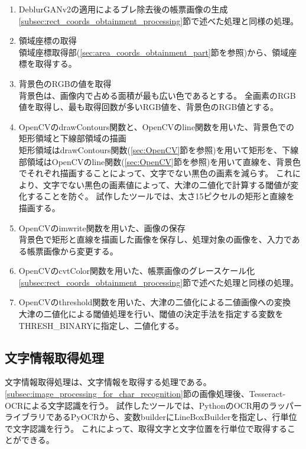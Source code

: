 \begin{enumerate}
    \item DeblurGANv2の適用によるブレ除去後の帳票画像の生成\\
        \ref{subsec:rect_coords_obtainment_processing}節で述べた処理と同様の処理。
    \item 領域座標の取得\\
        領域座標取得部(\ref{sec:area_coords_obtainment_part}節を参照)から、領域座標を取得する。
    \item 背景色のRGBの値を取得\\
        背景色は、画像内で占める面積が最も広い色であるとする。
        全画素のRGB値を取得し、最も取得回数が多いRGB値を、背景色のRGB値とする。
    \item OpenCVのdrawContours関数と、OpenCVのline関数を用いた、背景色での矩形領域と下線部領域の描画\\
        矩形領域はdrawContours関数(\ref{sec:OpenCV}節を参照)を用いて矩形を、下線部領域はOpenCVのline関数(\ref{sec:OpenCV}節を参照)を用いて直線を、背景色でそれぞれ描画することによって、文字でない黒色の画素を減らす。
        これにより、文字でない黒色の画素値によって、大津の二値化で計算する閾値が変化することを防ぐ。
        試作したツールでは、太さ15ピクセルの矩形と直線を描画する。
    \item OpenCVのimwrite関数を用いた、画像の保存\\
        背景色で矩形と直線を描画した画像を保存し、処理対象の画像を、入力である帳票画像から変更する。
    \item OpenCVのcvtColor関数を用いた、帳票画像のグレースケール化\\
        \ref{subsec:rect_coords_obtainment_processing}節で述べた処理と同様の処理。
    \item OpenCVのthreshold関数を用いた、大津の二値化による二値画像への変換\\
        大津の二値化による閾値処理を行い、閾値の決定手法を指定する変数をTHRESH\_BINARYに指定し、二値化する。
\end{enumerate}

\subsection{文字情報取得処理}\label{subsec:char_information_obtainment_processing}
文字情報取得処理は、文字情報を取得する処理である。
\ref{subsec:image_processing_for_char_recognition}節の画像処理後、Tesseract-OCRによる文字認識を行う。
試作したツールでは、PythonのOCR用のラッパーライブラリであるPyOCR\cite{PyOCR}から、変数builderにLineBoxBuilderを指定し、行単位で文字認識を行う。
これによって、取得文字と文字位置を行単位で取得することができる。

